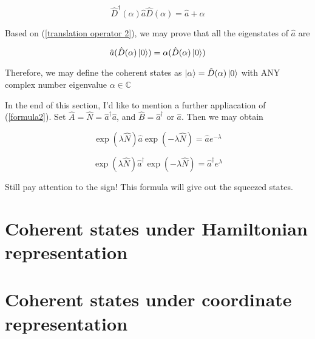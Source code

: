 \documentclass{article}
\begin{document}
        \begin{equation}\label{translation operator 2}
            \hat{D}^\dagger(\alpha)\hat{a}\hat{D}(\alpha) = \hat{a} + \alpha
        \end{equation}

        Based on (\ref{translation operator 2}), we may prove that all the eigenstates of $\hat{a}$ are 

        \begin{equation}
            \hat{a} (\hat{D}(\alpha)\ket{0}) = \alpha (\hat{D}(\alpha)\ket{0})
        \end{equation}

        Therefore, we may define the coherent states as $\ket{\alpha} = \hat{D}(\alpha)\ket{0}$ with ANY complex number eigenvalue $\alpha\in\mathbb{C}$

        \vbox{}

        \vbox{}

        In the end of this section, I'd like to mention a further appliacation of (\ref{formula2}). Set $\hat{A}=\hat{N}=\hat{a}^\dagger\hat{a}$, and $\hat{B}=\hat{a}^\dagger$ or $\hat{a}$. Then we may obtain

        \begin{equation}
            \exp(\lambda\hat{N})\hat{a}\exp(-\lambda\hat{N}) = \hat{a} e^{-\lambda}
        \end{equation}

        \begin{equation}
            \exp(\lambda\hat{N})\hat{a}^\dagger\exp(-\lambda\hat{N}) = \hat{a}^\dagger e^{\lambda}
        \end{equation}

        Still pay attention to the sign! This formula will give out the squeezed states. 

    \section{Coherent states under Hamiltonian representation}

    \section{Coherent states under coordinate representation}
\end{document}
